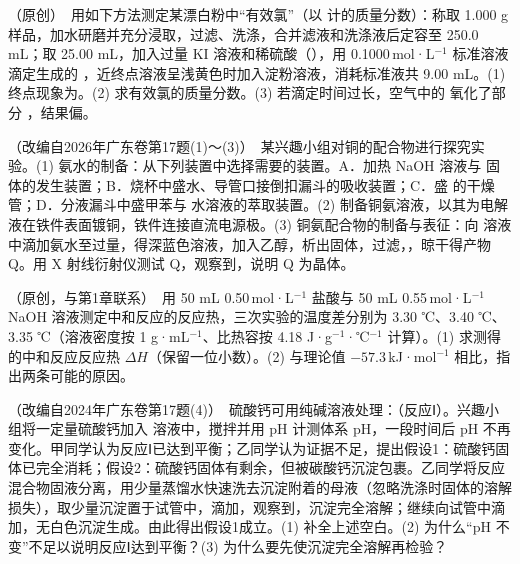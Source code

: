 \documentclass[UTF8,a4paper,zihao=5,oneside,openany,fontset=none]{ctexbook}
\def\kaishu{\CJKfamily{zhkai}}
\newcommand{\laiyuan}[1]{{\kaishu\small\color{graytext}（#1）}}
\newcommand{\tk}[1][3em]{\underline{\hspace{#1}}}
\newcommand{\kjmol}{\,kJ·mol$^{-1}$}
\newcommand{\molL}{\,mol·L$^{-1}$}
\begin{document}
\begin{xiti}
\item \laiyuan{原创}\ 用如下方法测定某漂白粉中“有效氯”（以  计的质量分数）：称取 1.000 g 样品，加水研磨并充分浸取，过滤、洗涤，合并滤液和洗涤液后定容至 250.0 mL；取 25.00 mL，加入过量 KI 溶液和稀硫酸（），用 0.1000\molL{}  标准溶液滴定生成的 ，近终点溶液呈浅黄色时加入淀粉溶液，消耗标准液共 9.00 mL。(1) 终点现象为\tk。(2) 求有效氯的质量分数。(3) 若滴定时间过长，空气中的  氧化了部分 ，结果偏\tk。

\item \laiyuan{改编自2026年广东卷第17题(1)～(3)}\ 某兴趣小组对铜的配合物进行探究实验。(1) 氨水的制备：从下列装置中选择需要的装置\tk。A．加热 NaOH 溶液与  固体的发生装置；B．烧杯中盛水、导管口接倒扣漏斗的吸收装置；C．盛  的干燥管；D．分液漏斗中盛甲苯与  水溶液的萃取装置。(2) 制备铜氨溶液，以其为电解液在铁件表面镀铜，铁件连接直流电源\tk{}极。(3) 铜氨配合物的制备与表征：向  溶液中滴加氨水至过量，得深蓝色溶液，加入乙醇，析出固体，过滤，\tk，晾干得产物 Q。用 X 射线衍射仪测试 Q，观察到\tk，说明 Q 为晶体。

\item \laiyuan{原创，与第1章联系}\ 用 50 mL 0.50\molL{} 盐酸与 50 mL 0.55\molL{} NaOH 溶液测定中和反应的反应热，三次实验的温度差分别为 3.30 ℃、3.40 ℃、3.35 ℃（溶液密度按 1 g·mL$^{-1}$、比热容按 4.18 J·g$^{-1}$·℃$^{-1}$ 计算）。(1) 求测得的中和反应反应热 $\Delta H$（保留一位小数）。(2) 与理论值 $-57.3$\kjmol{} 相比，指出两条可能的原因。

\item \laiyuan{改编自2024年广东卷第17题(4)}\ 硫酸钙可用纯碱溶液处理：（反应Ⅰ）。兴趣小组将一定量硫酸钙加入  溶液中，搅拌并用 pH 计测体系 pH，一段时间后 pH 不再变化。甲同学认为反应Ⅰ已达到平衡；乙同学认为证据不足，提出假设1：硫酸钙固体已完全消耗；假设2：硫酸钙固体有剩余，但被碳酸钙沉淀包裹。乙同学将反应混合物固液分离，用少量蒸馏水快速洗去沉淀附着的母液（忽略洗涤时固体的溶解损失），取少量沉淀置于试管中，滴加\tk，观察到\tk，沉淀完全溶解；继续向试管中滴加\tk，无白色沉淀生成。由此得出假设1成立。(1) 补全上述空白。(2) 为什么“pH 不变”不足以说明反应Ⅰ达到平衡？(3) 为什么要先使沉淀完全溶解再检验？
\end{xiti}
\end{document}
